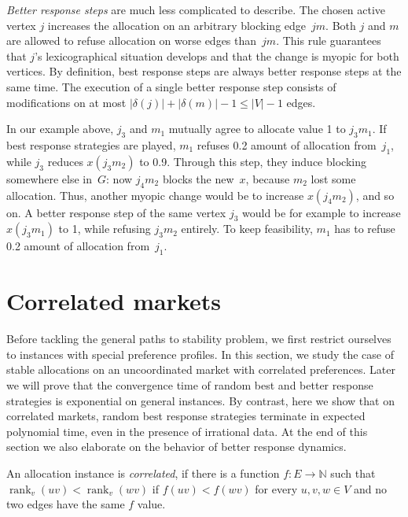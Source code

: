\documentclass{llncs}
\DeclareMathOperator{\rank}{rank}
\begin{document}
\emph{Better response steps} are much less complicated to describe. The chosen active vertex $j$ increases the allocation on an arbitrary blocking edge~$jm$. Both $j$ and $m$ are allowed to refuse allocation on worse edges than~$jm$. This rule guarantees that $j$'s lexicographical situation develops and that the change is myopic for both vertices. By definition, best response steps are always better response steps at the same time. The execution of a single better response step consists of modifications on at most $|\delta(j)| + |\delta(m)| - 1 \leq |V|-1$ edges.

In our example above, $j_3$ and $m_1$ mutually agree to allocate value 1 to $j_3m_1$. If best response strategies are played, $m_1$ refuses 0.2 amount of allocation from~$j_1$, while $j_3$ reduces $x(j_3m_2)$ to 0.9. Through this step, they induce blocking somewhere else in~$G$: now $j_4m_2$ blocks the new~$x$, because $m_2$ lost some allocation. Thus, another myopic change would be to increase $x(j_4m_2)$, and so on. A better response step of the same vertex $j_3$ would be for example to increase $x(j_3 m_1)$ to 1, while refusing $j_3m_2$ entirely. To keep feasibility, $m_1$ has to refuse 0.2 amount of allocation from~$j_1$.

\section{Correlated markets}
\label{sec:corr}

Before tackling the general paths to stability problem, we first restrict ourselves to instances with special preference profiles. In this section, we study the case of stable allocations on an uncoordinated market with correlated preferences. Later we will prove that the convergence time of random best and better response strategies is exponential on general instances. By contrast, here we show that on correlated markets, random best response strategies terminate in expected polynomial time, even in the presence of irrational data. At the end of this section we also elaborate on the behavior of better response dynamics.

\begin{definition}
An allocation instance is \emph{correlated}, if there is a function  $f: E \rightarrow \mathbb{N}$ such that $\rank_v(uv) < \rank_v(wv)$ if $f(uv) < f(wv)$ for every $u, v, w \in V$ and no two edges have the same $f$ value.
\end{definition}
\end{document}
